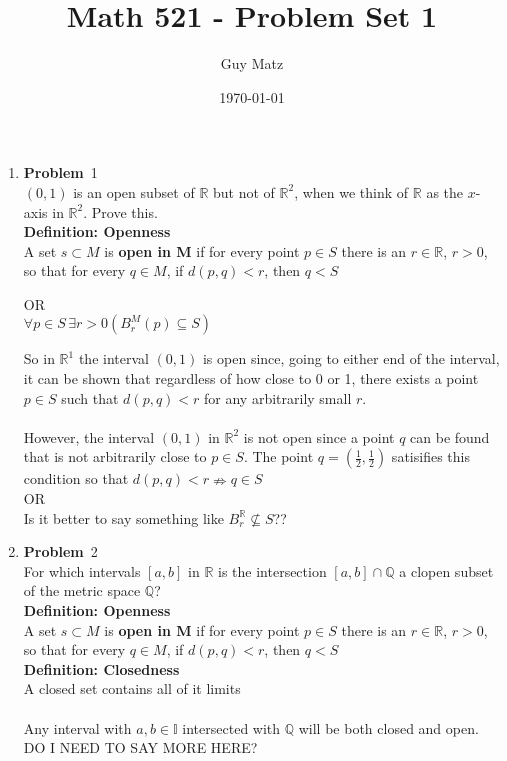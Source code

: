 \documentclass[12pt]{amsart}
\title{\textbf{Math 521 - Problem Set 1}}
\author{Guy Matz}
\date{\today}
\theoremstyle{definition}
\newcommand{\mbR}{\mathbb{R}}
\newcommand{\mbQ}{\mathbb{Q}}
\newcommand{\mbI}{\mathbb{I}}
\newcommand{\itep}{\item {\bfseries Problem}\ }
\begin{document}
 


\begin{enumerate}[series=p]
\itep 1 \\
$(0, 1)$ is an open subset of $\mbR$ but not of $\mbR^2$, when we think of $\mbR$ as the $x$-axis in $\mbR^2$.  Prove this.
\\

\textbf{Definition: Openness}\\
	A set $s \subset M$ is \textbf{open in M} if for every point $p \in S$ there is an $r \in \mbR$, $r>0$, so that for every $q \in M$,
	if $d(p,q) < r$, then $q < S$
	\begin{center}
		OR
		\\
		$\forall p \in S \, \exists r > 0 (B_r^M(p) \subseteq S)$
	\end{center}
So in $\mbR^1$ the interval $(0,1)$ is open since, going to either end of the interval, it can be shown that regardless of how close to 0 or 1, there exists a point $p \in S$ such that $d(p,q) < r$ for any arbitrarily small $r$.
\\
\\
However, the interval $(0,1)$ in $\mbR^2$ is not open since a point $q$ can be found that is not arbitrarily close to $p \in S$.  The point $q = (\frac{1}{2}, \frac{1}{2})$ satisifies this condition so that $d(p,q) < r \nRightarrow q \in S$
\\
OR
\\
Is it better to say something like $B_r^\mbR \nsubseteq S$??

\newpage

\itep 2 \\
For which intervals $[a,b]$ in $\mbR$ is the intersection $[a,b] \cap \mbQ$ a clopen subset of the metric space $\mbQ$?
\\
\textbf{Definition: Openness}\\
A set $s \subset M$ is \textbf{open in M} if for every point $p \in S$ there is an $r \in \mbR$, $r>0$, so that for every $q \in M$,
if $d(p,q) < r$, then $q < S$
\\
\textbf{Definition: Closedness}\\
A closed set contains all of it limits\\
\\
Any interval with $a, b \in \mbI$ intersected with $\mbQ$ will be  both closed and open.  DO I NEED TO SAY MORE HERE?
\newpage


\end{enumerate}
\end{document}
